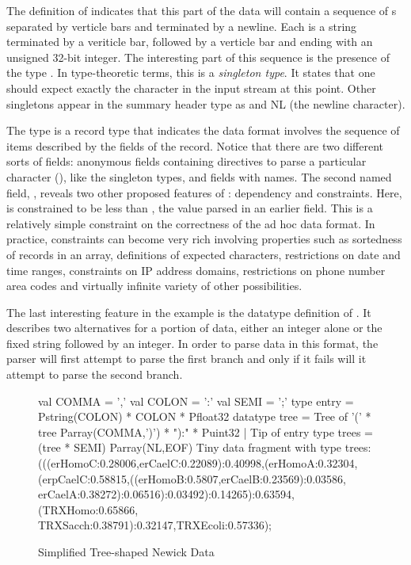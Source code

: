 \documentclass[11pt]{article}
\begin{document}
% 



The definition of  indicates that
this part of the \dibbler{} data will contain a sequence
of s separated by verticle bars and terminated by a newline.
Each  is a string terminated by a veriticle bar,
followed by a verticle bar and ending with an unsigned
32-bit integer.  The interesting part of this sequence is the
presence of the type .  In type-theoretic terms, this is
a {\em singleton type}.  It states that one should
 expect exactly the character  in the input stream at this point.
Other singletons appear in the summary header type as 
and NL (the newline character).

The type  is a record type that indicates
the data format involves the sequence of items described by
the fields of the record.  Notice that there are two different
sorts of fields: anonymous fields containing directives to parse
a particular character (), like the singleton types,
and fields with names.  The second named field,
, reveals two other proposed features of 
\datatype: dependency and constraints.  Here,
 is constrained to be less than
, the value parsed in an earlier field.
This is a relatively simple constraint on the correctness of the
ad hoc data format.  In practice, constraints can become very rich
involving properties such as sortedness of records in an array,
definitions of expected characters,
restrictions on date and time ranges, constraints on IP address
domains, restrictions on phone number area codes and virtually 
infinite variety of other possibilities. 

The last interesting feature in the \dibbler{} example is the
datatype definition of .  It describes
two alternatives for a portion of data, either an integer alone
or the fixed string  followed by an integer.
In order to parse data in this format, the parser will
first attempt to parse the first branch and only if it
fails will it attempt to parse the second branch.

\begin{figure}
\begin{code}
val COMMA  = ','  
val COLON  = ':'  
val SEMI   = ';'  
\mbox{}
type entry = Pstring(COLON) * COLON * Pfloat32
\mbox{}
datatype tree =
    Tree of '(' * tree Parray(COMMA,')') * "):" * Puint32
  | Tip of entry
\mbox{}
type trees = (tree * SEMI) Parray(NL,EOF)
\mbox{}
{\rm Tiny data fragment with type trees: }
\mbox{}
(((erHomoC:0.28006,erCaelC:0.22089):0.40998,(erHomoA:0.32304,
(erpCaelC:0.58815,((erHomoB:0.5807,erCaelB:0.23569):0.03586,
erCaelA:0.38272):0.06516):0.03492):0.14265):0.63594,(TRXHomo:0.65866,
TRXSacch:0.38791):0.32147,TRXEcoli:0.57336);
\end{code}
\caption{Simplified Tree-shaped Newick Data}
\label{figure:newick}
\end{figure}
\end{document}
